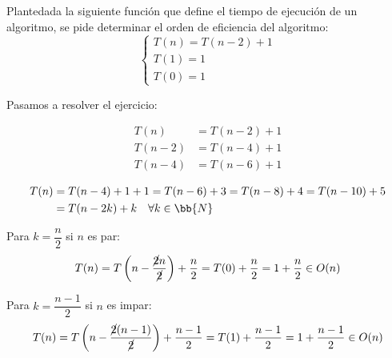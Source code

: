 \begin{ejemplo}
Plantedada la siguiente función que define el tiempo de ejecución de un algoritmo, se pide determinar el orden de eficiencia del algoritmo:
\begin{equation*}
    \left\{ \begin{array}{l}
    T(n) = T(n-2) +1\\
    T(1) = 1\\
    T(0) = 1
    \end{array}\right.
\end{equation*}

Pasamos a resolver el ejercicio:

\begin{align*}
    T(n) &= T(n-2) +1\\
    T(n-2) &= T(n-4)+1 \\
    T(n-4) &= T(n-6) + 1 
\end{align*}
  
\begin{align*}
    T(n) &= T(n-4)+1+1 = T(n-6) + 3= T(n-8) + 4 =T(n-10)+5\\
         &=  T(n-2k) + k\quad \forall k \in \bb{N}
\end{align*}
  
\begin{description}
    \item Para $k = \dfrac{n}{2}$ si $n$ es par:
\begin{equation*}
T(n) = T\left(n-\dfrac{\cancel{2}n}{\cancel{2}}\right) + \dfrac{n}{2} = T(0) + \dfrac{n}{2} = 1+\dfrac{n}{2} \in O(n)
\end{equation*}

\item Para $k = \dfrac{n-1}{2}$ si $n$ es impar:
\begin{equation*}
T(n) = T\left(n-\dfrac{\cancel{2}(n-1)}{\cancel{2}}\right) + \dfrac{n-1}{2} = T(1) +\dfrac{n-1}{2} = 1+\dfrac{n-1}{2}\in O(n) 
\end{equation*}
\end{description}

\end{ejemplo}

